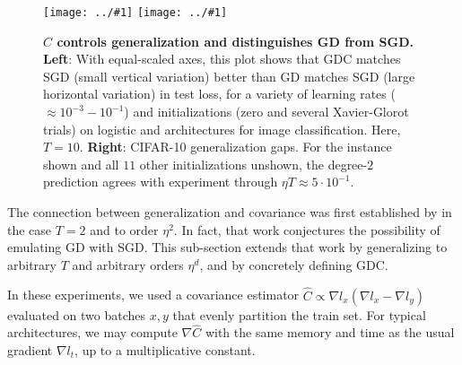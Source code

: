 \documentclass{article}
\theoremstyle{plain}
\theoremstyle{definition}
\newcommand{\plotmooh}[3]{\texttt{[image: ../\#1]}}
\begin{document}
        \begin{figure}[h!] 
            \centering
            \plotmooh{plots/new-big-bm-new}{}{3.0cm}
            \plotmooh{plots/rebut-gen-cifar-lenet-4}{}{3.0cm}
            \caption{
                {\bf $C$ controls generalization and distinguishes GD from
                SGD.}
                {\bf Left}: With equal-scaled axes, this plot shows that GDC
                matches SGD (small vertical variation) better than GD matches
                SGD (large horizontal variation) in test loss, for a variety of
                learning rates ($\approx 10^{-3}-10^{-1}$) and initializations
                (zero and several Xavier-Glorot trials) on logistic and
                architectures for image classification.  Here, $T=10$. 
                {\bf Right}: CIFAR-10 generalization gaps.
                For the instance shown and all $11$ other
                initializations unshown, the degree-$2$ prediction agrees with
                experiment through $\eta T \approx 5\cdot 10^{-1}$.
            }
            \label{fig:batchandgen}
        \end{figure}

        The connection between generalization and covariance was first
        established by \citet{ro18} in the case $T=2$ and to order $\eta^2$. 
        In fact, that work conjectures the possibility of emulating GD with
        SGD.  This sub-section extends that work by generalizing to arbitrary
        $T$ and arbitrary orders $\eta^d$, and by concretely defining GDC.

        In these experiments, we used a covariance estimator $\hat C \propto
        \nabla l_x (\nabla l_x - \nabla l_y)$ evaluated on two batches $x, y$
        that evenly partition the train set.  For typical architectures, we may
        compute $\nabla \hat C$ with the same memory and time as the usual
        gradient $\nabla l_t$, up to a multiplicative constant. 

\end{document}

